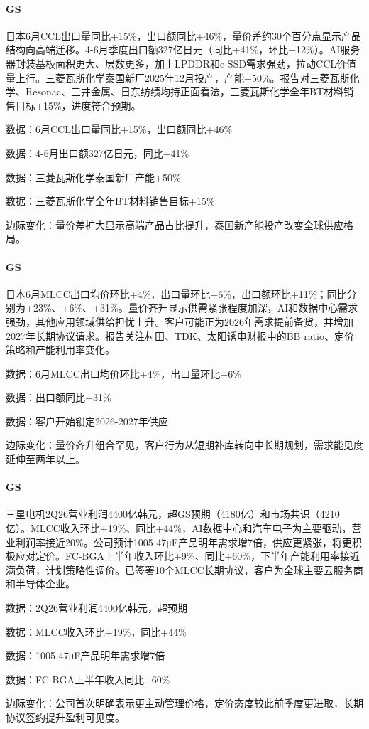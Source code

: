 \documentclass[11pt]{ctexart}
\begin{document}
\paragraph{GS} 日本6月CCL出口量同比+15\%，出口额同比+46\%，量价差约30个百分点显示产品结构向高端迁移。4-6月季度出口额327亿日元（同比+41\%，环比+12\%）。AI服务器封装基板面积更大、层数更多，加上LPDDR和e-SSD需求强劲，拉动CCL价值量上行。三菱瓦斯化学泰国新厂2025年12月投产，产能+50\%。报告对三菱瓦斯化学、Resonac、三井金属、日东纺绩均持正面看法，三菱瓦斯化学全年BT材料销售目标+15\%，进度符合预期。
{\small\color{refgray}数据：6月CCL出口量同比+15\%，出口额同比+46\%\par}
{\small\color{refgray}数据：4-6月出口额327亿日元，同比+41\%\par}
{\small\color{refgray}数据：三菱瓦斯化学泰国新厂产能+50\%\par}
{\small\color{refgray}数据：三菱瓦斯化学全年BT材料销售目标+15\%\par}
{\small\color{refgray}边际变化：量价差扩大显示高端产品占比提升，泰国新产能投产改变全球供应格局。\par}
\paragraph{GS} 日本6月MLCC出口均价环比+4\%，出口量环比+6\%，出口额环比+11\%；同比分别为+23\%、+6\%、+31\%。量价齐升显示供需紧张程度加深，AI和数据中心需求强劲，其他应用领域供给担忧上升。客户可能正为2026年需求提前备货，并增加2027年长期协议请求。报告关注村田、TDK、太阳诱电财报中的BB ratio、定价策略和产能利用率变化。
{\small\color{refgray}数据：6月MLCC出口均价环比+4\%，出口量环比+6\%\par}
{\small\color{refgray}数据：出口额同比+31\%\par}
{\small\color{refgray}数据：客户开始锁定2026-2027年供应\par}
{\small\color{refgray}边际变化：量价齐升组合罕见，客户行为从短期补库转向中长期规划，需求能见度延伸至两年以上。\par}
\paragraph{GS} 三星电机2Q26营业利润4400亿韩元，超GS预期（4180亿）和市场共识（4210亿）。MLCC收入环比+19\%、同比+44\%，AI数据中心和汽车电子为主要驱动，营业利润率接近20\%。公司预计1005 47μF产品明年需求增7倍，供应更紧张，将更积极应对定价。FC-BGA上半年收入环比+9\%、同比+60\%，下半年产能利用率接近满负荷，计划策略性调价。已签署10个MLCC长期协议，客户为全球主要云服务商和半导体企业。
{\small\color{refgray}数据：2Q26营业利润4400亿韩元，超预期\par}
{\small\color{refgray}数据：MLCC收入环比+19\%，同比+44\%\par}
{\small\color{refgray}数据：1005 47μF产品明年需求增7倍\par}
{\small\color{refgray}数据：FC-BGA上半年收入同比+60\%\par}
{\small\color{refgray}边际变化：公司首次明确表示更主动管理价格，定价态度较此前季度更进取，长期协议签约提升盈利可见度。\par}
\end{document}
